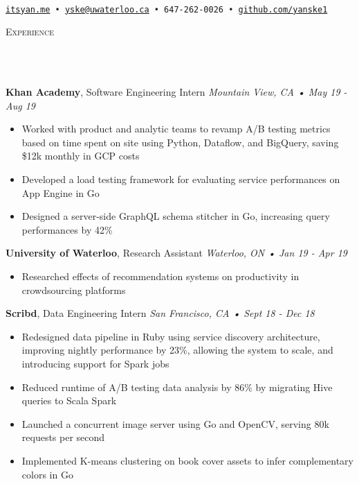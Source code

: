 \documentclass[a4paper, 11pt, hidelinks]{article}
\newcommand{\lineunder} {
    \vspace*{-8pt} \\
    \hrulefill \\
}
\newcommand{\header} [1] {
    {\hspace*{-4pt}\vspace*{6pt} \textsc{#1}}
    \vspace*{-6pt}
    \lineunder
    \vspace{6pt}
}
\begin{document}
\vspace*{-35pt}
\begin{center}
	\text{\fontsize{35}{40} \selectfont {Yan Ke}}\\
    \vspace{10pt}
    \texttt{\href{http://www.itsyan.me}{itsyan.me} • \href{mailto:yske@uwaterloo.ca}{yske@uwaterloo.ca} • 647-262-0026 •
    \href{http://www.github.com/yanske1}{github.com/yanske1}}
\end{center}
\vspace{-2pt}

\header{Experience}
\textbf{Khan Academy}, Software Engineering Intern \hfill\textit{Mountain View, CA • May 19 - Aug 19}\\
\vspace{-2mm}
\begin{itemize}[leftmargin=2em] \itemsep 1pt
    \item Worked with product and analytic teams to revamp A/B testing metrics based on time spent on site
    using Python, Dataflow, and BigQuery, saving \$12k monthly in GCP costs
    \item Developed a load testing framework for evaluating service performances on App Engine in Go
    \item Designed a server-side GraphQL schema stitcher in Go, increasing query performances by 42\%
\end{itemize}

\textbf{University of Waterloo}, Research Assistant \hfill\textit{Waterloo, ON • Jan 19 - Apr 19}\\
\vspace{-2mm}
\begin{itemize}[leftmargin=2em] \itemsep 1pt
	\item Researched effects of recommendation systems on productivity in crowdsourcing platforms
\end{itemize}

\textbf{Scribd}, Data Engineering Intern \hfill\textit{San Francisco, CA • Sept 18 - Dec 18}\\
\vspace{-2mm}
\begin{itemize}[leftmargin=2em] \itemsep 1pt
	\item Redesigned data pipeline in Ruby using service discovery architecture, improving nightly performance
    by 23\%, allowing the system to scale, and introducing support for Spark jobs
	\item Reduced runtime of A/B testing data analysis by 86\% by migrating Hive queries to Scala Spark
	\item Launched a concurrent image server using Go and OpenCV, serving 80k requests per second
	\item Implemented K-means clustering on book cover assets to infer complementary colors in Go
\end{itemize}
\end{document}
